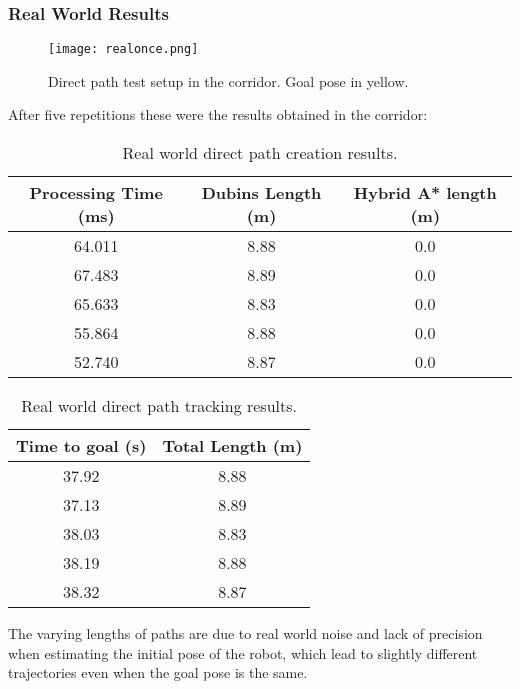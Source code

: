 \clearpage
\subsubsection{Real World Results}
\begin{figure}[h]
    \centering
    \texttt{[image: realonce.png]}
    \caption{Direct path test setup in the corridor. Goal pose in yellow.}
    \label{fig:real1}
\end{figure}

After five repetitions these were the results obtained in the corridor:
\begin{table}[H]
    \centering
    \begin{tabular}{|c|c|c|}
        \hline
        \textbf{Processing Time (ms)} & \textbf{Dubins Length (m)} & \textbf{Hybrid A* length (m)} \\
        \hline
         64.011 & 8.88 & 0.0 \\
        \hline
         67.483 & 8.89 & 0.0 \\
         \hline
         65.633 & 8.83 & 0.0 \\
         \hline
         55.864 & 8.88 & 0.0 \\
         \hline
         52.740 & 8.87 & 0.0 \\
         \hline
    \end{tabular}
    \caption{Real world direct path creation results.}
    \label{tab:direct_path_results3}
    
\end{table}
\begin{table}[H]
    \centering
    \begin{tabular}{|c|c|}
        \hline
        \textbf{Time to goal (s)} & \textbf{Total Length (m)} \\
        \hline
        37.92 & 8.88 \\
        \hline
        37.13 & 8.89 \\
         \hline
         38.03 & 8.83 \\
         \hline
         38.19 & 8.88 \\
         \hline
         38.32 & 8.87 \\
         \hline
    \end{tabular}
    \caption{Real world direct path tracking results.}
    \label{tab:direct_path_results4}
\end{table}

The varying lengths of paths are due to real world noise and lack of precision when 
estimating the initial pose of the robot, which lead to slightly different trajectories 
even when the goal pose is the same.
\clearpage

